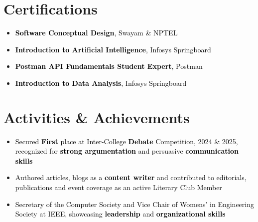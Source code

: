 \documentclass[a4paper,20pt]{article}
\begin{document}

\section{Certifications}
\vspace{5pt}
\begin{itemize}[label=\textbullet, labelsep=0.5em, left=0.5em, itemsep=-0.2em]
  \item \textcolor{black}{\textbf{Software Conceptual Design}, Swayam \& NPTEL}
  \item \textcolor{black}{\textbf{Introduction to Artificial Intelligence}, Infosys Springboard}
  \item \textcolor{black}{\textbf{Postman API Fundamentals Student Expert}, Postman}
  \item \textcolor{black}{\textbf{Introduction to Data Analysis}, Infosys Springboard}
\end{itemize}
\vspace{4pt}



\section{Activities \& Achievements}
\vspace{5pt}
\begin{itemize}[label=\textbullet, labelsep=0.5em, left=0.5em, itemsep=-0.2em]
  \item \textcolor{black}{Secured \textbf{First} place at Inter-College \textbf{Debate} Competition, 2024 \& 2025, recognized for \textbf{strong argumentation} and persuasive \textbf{communication skills}}
  \item \textcolor{black}{Authored articles, blogs as a \textbf{content writer} and contributed to editorials, publications and event coverage as an active Literary Club Member}
  \item \textcolor{black}{Secretary of the Computer Society and Vice Chair of Womens' in Engineering Society at IEEE, showcasing \textbf{leadership} and \textbf{organizational skills}}
\end{itemize}
\end{document}
